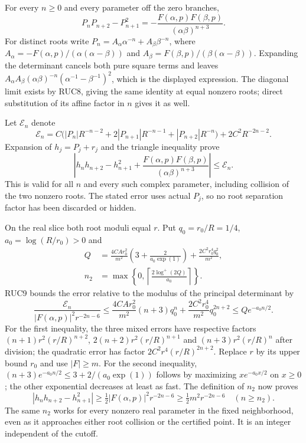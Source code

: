 For every $n\ge0$ and every parameter off the zero branches,
\[
 P_nP_{n+2}-P_{n+1}^2
       =-\frac{F(\alpha,p)F(\beta,p)}{(\alpha\beta)^{n+3}}.
 \tag{RUC17}
\]
For distinct roots write
$P_n=A_\alpha\alpha^{-n}+A_\beta\beta^{-n}$, where
$A_\alpha=-F(\alpha,p)/(\alpha(\alpha-\beta))$ and
$A_\beta=F(\beta,p)/(\beta(\alpha-\beta))$.
Expanding the determinant cancels both pure square terms and
leaves
$A_\alpha A_\beta(\alpha\beta)^{-n}(\alpha^{-1}-\beta^{-1})^2$,
which is the displayed expression.  The diagonal limit exists
by RUC8, giving the same identity at equal nonzero roots; direct
substitution of its affine factor in $n$ gives it as well.

Let $\mathcal E_n$ denote
\[
 \mathcal E_n=C\bigl(|P_n|R^{-n-2}
          +2|P_{n+1}|R^{-n-1}+|P_{n+2}|R^{-n}\bigr)
                    +2C^2R^{-2n-2}.
 \tag{RUC18}
\]
Expansion of $h_j=P_j+r_j$ and the triangle inequality prove
\[
 \left|h_nh_{n+2}-h_{n+1}^2
       +\frac{F(\alpha,p)F(\beta,p)}{(\alpha\beta)^{n+3}}\right|
       \le\mathcal E_n.
 \tag{RUC19}
\]
This is valid for all $n$ and every such complex parameter,
including collision of the two nonzero roots.  The stated
error uses actual $P_j$, so no root separation factor has been
discarded or hidden.

On the real slice both root moduli equal $r$.  Put
$q_0=r_0/R=1/4$, $a_0=\log(R/r_0)>0$ and
\[
 \begin{aligned}
 Q&=\frac{4CA r_0^2}{m^2}\left(3+\frac2{a_0\exp(1)}\right)
             +\frac{2C^2r_0^4q_0^2}{m^2},\\
 n_2&=\max\left\{0,
              \left\lceil\frac{2\log^+(2Q)}{a_0}\right\rceil\right\}.
 \end{aligned}\tag{RUC20}
\]
RUC9 bounds the error relative to the modulus of the principal
determinant by
\[
 \frac{\mathcal E_n}{|F(\alpha,p)|^2r^{-2n-6}}
 \le\frac{4CA r_0^2}{m^2}(n+3)q_0^n
                  +\frac{2C^2r_0^4}{m^2}q_0^{2n+2}
 \le Q e^{-a_0n/2}.
\]
For the first inequality, the three mixed errors have respective
factors $(n+1)r^2(r/R)^{n+2}$,
$2(n+2)r^2(r/R)^{n+1}$ and $(n+3)r^2(r/R)^n$ after division;
the quadratic error has factor $2C^2r^4(r/R)^{2n+2}$.
Replace $r$ by its upper bound $r_0$ and use $|F|\ge m$.
For the second inequality,
$(n+3)e^{-a_0n/2}\le3+2/(a_0\exp(1))$ follows by maximizing
$x e^{-a_0x/2}$ on $x\ge0$; the other exponential decreases
at least as fast.  The definition of $n_2$ now proves
\[
 |h_nh_{n+2}-h_{n+1}^2|
       \ge\tfrac12|F(\alpha,p)|^2r^{-2n-6}
       \ge\tfrac12m^2r^{-2n-6}\quad(n\ge n_2).
 \tag{RUC21}
\]
The same $n_2$ works for every nonzero real parameter in the
fixed neighborhood, even as it approaches either root collision
or the certified point.  It is an integer independent of the cutoff.

